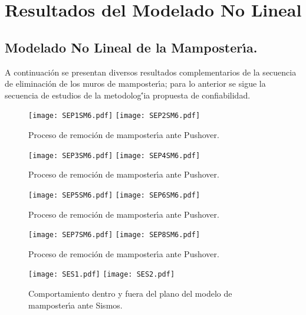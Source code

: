 
\chapter{Resultados del Modelado No Lineal}

\section{Modelado No Lineal de la Mamposter\'{\i}a.}

A continuaci\'on se presentan diversos resultados complementarios de la secuencia de eliminaci\'on de los muros de mamposter\'{\i}a; para lo anterior se sigue la secuencia de estudios de la metodolog\'{'i}a propuesta de confiabilidad.

\begin{figure} [htbp]
\texttt{[image: SEP1SM6.pdf]}
\texttt{[image: SEP2SM6.pdf]}
\caption{Proceso de remoci\'on de mamposter\'{\i}a ante Pushover.}
\label{fig:apu1}
\end{figure}

\begin{figure} [htbp]
\texttt{[image: SEP3SM6.pdf]}
\texttt{[image: SEP4SM6.pdf]}
\caption{Proceso de remoci\'on de mamposter\'{\i}a ante Pushover.}
\label{fig:apu2}
\end{figure}

\begin{figure} [htbp]
\texttt{[image: SEP5SM6.pdf]}
\texttt{[image: SEP6SM6.pdf]}
\caption{Proceso de remoci\'on de mamposter\'{\i}a ante Pushover.}
\label{fig:apu3}
\end{figure}

\begin{figure} [htbp]
\texttt{[image: SEP7SM6.pdf]}
\texttt{[image: SEP8SM6.pdf]}
\caption{Proceso de remoci\'on de mamposter\'{\i}a ante Pushover.}
\label{fig:apu4}
\end{figure}

\begin{figure} [htbp]
\texttt{[image: SES1.pdf]}
\texttt{[image: SES2.pdf]}
\caption{Comportamiento dentro y fuera del plano del modelo de mamposter\'{\i}a ante Sismos.}
\label{fig:apu5}
\end{figure}

